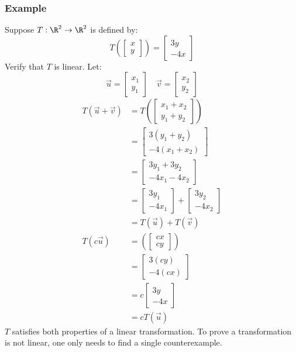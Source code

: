 \documentclass[letterpaper, 12pt]{math}
\begin{document}
\subsubsection*{Example}
Suppose \( T:\R^2\to\R^2 \) is defined by:
\[ T\left(\begin{bmatrix}x \\ y\end{bmatrix}\right) = \begin{bmatrix}3y \\
  -4x\end{bmatrix} \]
Verify that \( T \) is linear. Let:
\[ \vec{u} = \begin{bmatrix}x_1 \\ y_1\end{bmatrix} \quad
  \vec{v} = \begin{bmatrix}x_2 \\ y_2\end{bmatrix} \]
\begin{align*}
  T(\vec{u}+\vec{v}) &=
    T\left(\begin{bmatrix}x_1+x_2 \\ y_1+y_2\end{bmatrix}\right) \\
  &= \begin{bmatrix}
    3(y_1+y_2) \\
    -4(x_1+x_2)
  \end{bmatrix} \\
  &= \begin{bmatrix}
    3y_1+3y_2 \\
    -4x_1-4x_2
  \end{bmatrix} \\
  &= \begin{bmatrix}
    3y_1 \\
    -4x_1
  \end{bmatrix}+\begin{bmatrix}
    3y_2 \\
    -4x_2
  \end{bmatrix} \\
  &= T(\vec{u})+T(\vec{v}) \\
  T(c\vec{u}) &= \left(\begin{bmatrix}cx \\ cy\end{bmatrix}\right) \\
  &= \begin{bmatrix}
    3(cy) \\
    -4(cx)
  \end{bmatrix} \\
  &= c\begin{bmatrix}
    3y \\
    -4x
  \end{bmatrix} \\
  &= cT(\vec{u})
\end{align*}
\( T \) satisfies both properties of a linear transformation. To prove a
transformation is not linear, one only needs to find a single counterexample.
\end{document}
